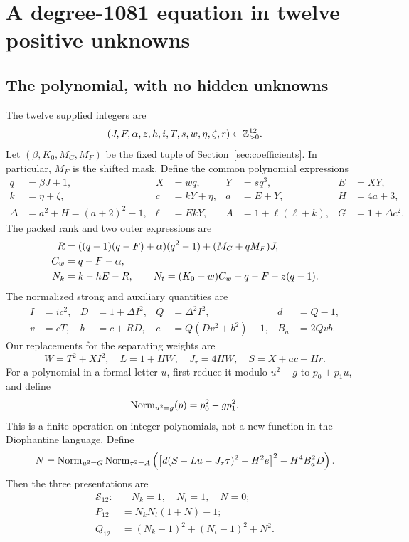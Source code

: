 \section{A degree-1081 equation in twelve positive unknowns}
\label{sec:twelve}

\subsection{The polynomial, with no hidden unknowns}
The twelve supplied integers are
\[
 (J,F,\alpha,z,h,i,T,s,w,\eta,\zeta,r)\in\mathbb Z_{>0}^{12}.
\]
Let $(\beta,K_0,M_C,M_F)$ be the fixed tuple of
Section~\ref{sec:coefficients}. In particular, $M_F$ is the shifted mask.
Define the common polynomial expressions
\begin{align*}
 q&=\beta J+1,& X&=wq,&Y&=sq^3,&E&=XY,\\
 k&=\eta+\zeta,&c&=kY+\eta,&a&=E+Y,&H&=4a+3,\\
 \Delta&=a^2+H=(a+2)^2-1,&
 \ell&=EkY,&A&=1+\ell(\ell+k),&G&=1+\Delta c^2.
\end{align*}
The packed rank and two outer expressions are
\begin{align}
 R&=((q-1)(q-F)+\alpha)(q^2-1)+(M_C+qM_F)J,\notag\\
 C_w&=q-F-\alpha,\notag\\
 N_k&=k-hE-R,\qquad
 N_t=(K_0+w)C_w+q-F-z(q-1).\label{eq:outer12}
\end{align}
The normalized strong and auxiliary quantities are
\begin{align*}
 I&=ic^2,&D&=1+\Delta I^2,&Q&=\Delta^2I^2,&d&=Q-1,\\
 v&=cT,&b&=c+RD,&e&=Q(Dv^2+b^2)-1,&B_a&=2Qvb.
\end{align*}
Our replacements for the separating weights are
\begin{equation}
 \boxed{W=T^2+XI^2,\quad L=1+HW,\quad J_\tau=4HW,\quad
 S=X+ac+Hr.}\label{eq:newweights}
\end{equation}
For a polynomial in a formal letter $u$, first reduce it modulo $u^2-g$ to
$p_0+p_1u$, and define
\[
 \operatorname{Norm}_{u^2=g}(p)=p_0^2-gp_1^2.
\]
This is a finite operation on integer polynomials, not a new function in the
Diophantine language. Define
\begin{equation}
 N=\operatorname{Norm}_{u^2=G}\operatorname{Norm}_{\tau^2=A}
 \left(\left[d(S-Lu-J_\tau\tau)^2-H^2e\right]^2
              -H^4B_a^2D\right).
 \label{eq:norm12}
\end{equation}
Then the three presentations are
\begin{align}
 \mathcal S_{12}:&\quad N_k=1,\quad N_t=1,\quad N=0;\label{eq:system12}\\
 P_{12}&=\boxed{N_kN_t(1+N)-1;}\label{eq:product12}\\
 Q_{12}&=(N_k-1)^2+(N_t-1)^2+N^2.\label{eq:sos12}
\end{align}


